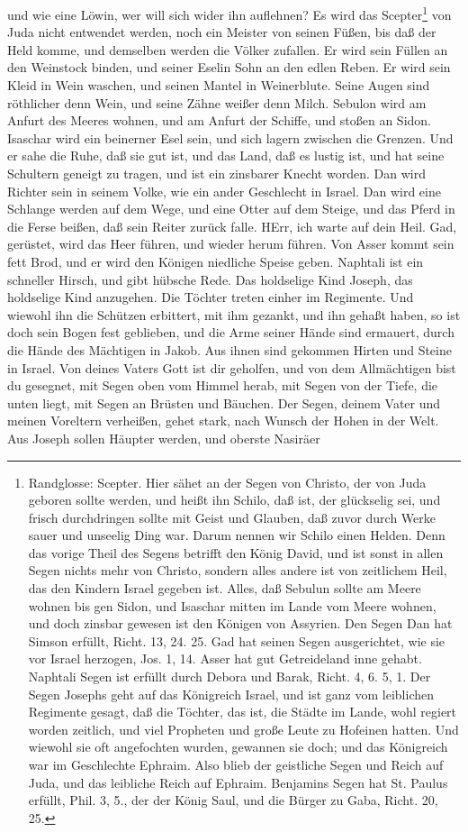 und wie eine Löwin, wer will sich wider ihn auflehnen? Es wird das Scepter\footnote{Randglosse: Scepter. Hier sähet an der Segen von Christo, der von Juda geboren sollte werden, und heißt ihn Schilo, daß ist, der glückselig sei, und frisch durchdringen sollte mit Geist und Glauben, daß zuvor durch Werke sauer und unseelig Ding war. Darum nennen wir Schilo einen Helden. Denn das vorige Theil des Segens betrifft den König David, und ist sonst in allen Segen nichts mehr von Christo, sondern alles andere ist von zeitlichem Heil, das den Kindern Israel gegeben ist. Alles, daß Sebulun sollte am Meere wohnen bis gen Sidon, und Isaschar mitten im Lande vom Meere wohnen, und doch zinsbar gewesen ist den Königen von Assyrien. Den Segen Dan hat Simson erfüllt, Richt. 13, 24. 25. Gad hat seinen Segen ausgerichtet, wie sie vor Israel herzogen, Jos. 1, 14. Asser hat gut Getreideland inne gehabt. Naphtali Segen ist erfüllt durch Debora und Barak, Richt. 4, 6. 5, 1. Der Segen Josephs geht auf das Königreich Israel, und ist ganz vom leiblichen Regimente gesagt, daß die Töchter, das ist, die Städte im Lande, wohl regiert worden zeitlich, und viel Propheten und große Leute zu Hofeinen hatten. Und wiewohl sie oft angefochten wurden, gewannen sie doch; und das Königreich war im Geschlechte Ephraim. Also blieb der geistliche Segen und Reich auf Juda, und das leibliche Reich auf Ephraim. Benjamins Segen hat St. Paulus erfüllt, Phil. 3, 5., der der König Saul, und die Bürger zu Gaba, Richt. 20, 25.} von Juda nicht entwendet werden, noch ein Meister von seinen Füßen, bis daß der Held komme, und demselben werden die Völker zufallen. Er wird sein Füllen an den Weinstock binden, und seiner Eselin Sohn an den edlen Reben. Er wird sein Kleid in Wein waschen, und seinen Mantel in Weinerblute. Seine Augen sind röthlicher denn Wein, und seine Zähne weißer denn Milch. Sebulon wird am Anfurt des Meeres wohnen, und am Anfurt der Schiffe, und stoßen an Sidon. Isaschar wird ein beinerner Esel sein, und sich lagern zwischen die Grenzen. Und er sahe die Ruhe, daß sie gut ist, und das Land, daß es lustig ist, und hat seine Schultern geneigt zu tragen, und ist ein zinsbarer Knecht worden. Dan wird Richter sein in seinem Volke, wie ein ander Geschlecht in Israel. Dan wird eine Schlange werden auf dem Wege, und eine Otter auf dem Steige, und das Pferd in die Ferse beißen, daß sein Reiter zurück falle. HErr, ich warte auf dein Heil. Gad, gerüstet, wird das Heer führen, und wieder herum führen. Von Asser kommt sein fett Brod, und er wird den Königen niedliche Speise geben. Naphtali ist ein schneller Hirsch, und gibt hübsche Rede. Das holdselige Kind Joseph, das holdselige Kind anzugehen. Die Töchter treten einher im Regimente. Und wiewohl ihn die Schützen erbittert, mit ihm gezankt, und ihn gehaßt haben, so ist doch sein Bogen fest geblieben, und die Arme seiner Hände sind ermauert, durch die Hände des Mächtigen in Jakob. Aus ihnen sind gekommen Hirten und Steine in Israel. Von deines Vaters Gott ist dir geholfen, und von dem Allmächtigen bist du gesegnet, mit Segen oben vom Himmel herab, mit Segen von der Tiefe, die unten liegt, mit Segen an Brüsten und Bäuchen. Der Segen, deinem Vater und meinen Voreltern verheißen, gehet stark, nach Wunsch der Hohen in der Welt. Aus Joseph sollen Häupter werden, und oberste Nasiräer 
